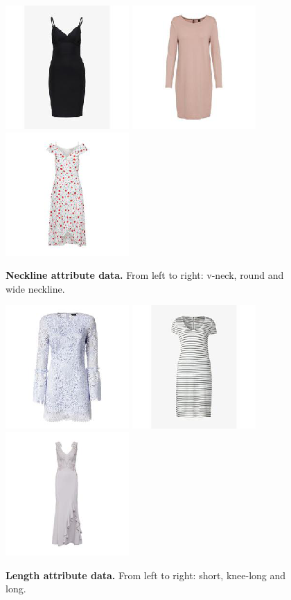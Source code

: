 \documentclass[12pt]{report}
\begin{document}
\begin{figure}[!h]
{\includegraphics[width=.2\linewidth]{03_analysis/data/neckline_v}}
{\includegraphics[width=.2\linewidth]{03_analysis/data/neckline_round}}
{\includegraphics[width=.2\linewidth]{03_analysis/data/neckline_wide}}
\caption{\label{fig:neckline_data} \textbf{Neckline attribute data.} From left to right: v-neck, round and wide neckline.}

{\includegraphics[width=.2\linewidth]{03_analysis/data/length_short}}
{\includegraphics[width=.2\linewidth]{03_analysis/data/length_knee}}
{\includegraphics[width=.2\linewidth]{03_analysis/data/length_long}}
\caption{\label{fig:length_data} \textbf{Length attribute data.} From left to right: short, knee-long and long.}


\end{figure}
\end{document}
